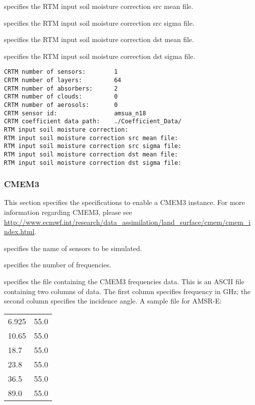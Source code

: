   specifies
 the RTM input soil moisture correction src mean file.

  specifies
 the RTM input soil moisture correction src sigma file.

  specifies
 the RTM input soil moisture correction dst mean file.

  specifies
 the RTM input soil moisture correction dst sigma file.
 

 \begin{Verbatim}[frame=single]
CRTM number of sensors:        1
CRTM number of layers:         64
CRTM number of absorbers:      2
CRTM number of clouds:         0 
CRTM number of aerosols:       0 
CRTM sensor id:                amsua_n18  
CRTM coefficient data path:    ./Coefficient_Data/
RTM input soil moisture correction:
RTM input soil moisture correction src mean file:
RTM input soil moisture correction src sigma file:
RTM input soil moisture correction dst mean file:
RTM input soil moisture correction dst sigma file:
 \end{Verbatim}

 
 \subsubsection{CMEM3} \label{ssec:cmem3}
 This section specifies the specifications to enable a CMEM3 instance.
 For more information regarding CMEM3, please see \\
 \hyperref{http://www.ecmwf.int/research/data\_assimilation/land\_surface/cmem/cmem\_index.html}{}{}{http://www.ecmwf.int/research/data\_assimilation/land\_surface/cmem/cmem\_index.html}.

  specifies the name of sensors to be simulated.

  specifies the number of
 frequencies.

  specifies the file
 containing the CMEM3 frequencies data.
 This is an ASCII file containing two columns of data.
 The first column specifies frequency in GHz; the second column
 specifies the incidence angle.  A sample file for AMSR-E:

 \begin{tabular}{lr}
  6.925 & 55.0 \\
  10.65 & 55.0 \\
  18.7  & 55.0 \\
  23.8  & 55.0 \\
  36.5  & 55.0 \\
  89.0  & 55.0 \\
 \end{tabular}

